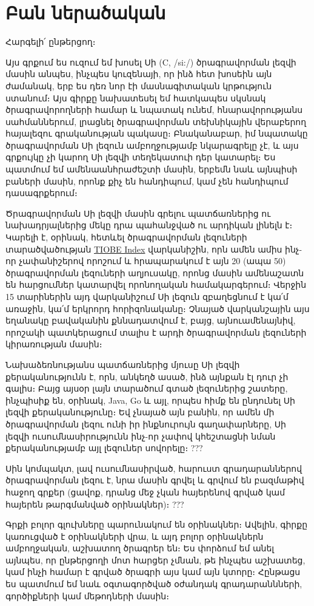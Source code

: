 \chapter*{Բան ներածական}

Հարգելի՛ ընթերցող։

Այս գրքում ես ուզում եմ խոսել Սի (C, /si:/) ծրագրավորման լեզվի մասին անպես, ինչպես կուզենայի, որ ինձ հետ խոսեին այն ժամանակ, երբ ես դեռ նոր էի մասնագիտական կրթություն ստանում։ Այս գիրքը նախատեսել եմ հատկապես սկսնակ ծրագրավորողների համար և նպատակ ունեմ, հնարավորությանս սահմաններում, լրացնել ծրագրավորման տեխնիկային վերաբերող հայալեզու գրականության պակասը։ Բնականաբար, իմ նպատակը ծրագրավորման Սի լեզուն ամբողջությամբ նկարագրելը չէ, և այս գրքույկը չի կարող Սի լեզվի տեղեկատուի դեր կատարել։ Ես պատմում եմ ամենաանհրաժեշտի մասին, երբեմն նաև այնպիսի բաների մասին, որոնք քիչ են հանդիպում, կամ չեն հանդիպում դասագրքերում։

Ծրագրավորման Սի լեզվի մասին գրելու պատճառներից ու նախադրյալներից մեկը դրա պահանջված ու արդիկան լինելն է։ Կարելի է, օրինակ, հետևել ծրագրավորման լեզուների տարածվածության \href{http://www.tiobe.com/index.php/content/paperinfo/tpci/index.html}{TIOBE Index} վարկանիշին, որն ամեն ամիս ինչ-որ չափանիշերով որոշում և հրապարակում է այն 20 (ապա 50) ծրագրավորման լեզուների աղյուսակը, որոնց մասին ամենաշատն են հարցումներ կատարվել որոնողական համակարգերում։ Վերջին 15 տարիներին այդ վարկանիշում Սի լեզուն զբաղեցնում է կա՛մ առաջին, կա՛մ երկրորդ հորիզոնականը։ Չնայած վարկանշային այս եղանակը բավականին քննադատվում է, բայց, այնուամենայնիվ, որոշակի պատկերացում տալիս է արդի ծրագրավորման լեզուների կիրառության մասին։

Նախաձեռնությանս պատճառներից մյուսը Սի լեզվի քերականությունն է, որն, անկեղծ ասած, ինձ այնքան էլ դուր չի գալիս։ Բայց այսօր լայն տարածում գտած լեզուներից շատերը, ինչպիսիք են, օրինակ, Java, Go և այլ, որպես հիմք են ընդունել Սի լեզվի քերականությունը։ Եվ չնայած այն բանին, որ ամեն մի ծրագրավորման լեզու ունի իր ինքնուրույն գաղափարները, Սի լեզվի ուսումնասիրությունն ինչ-որ չափով կհեշտացնի նման քերականությամբ այլ լեզուներ սովորելը։ ???

Սին կոմպակտ, լավ ուսումնասիրված, հարուստ գրադարաններով ծրագրավորման լեզու է, նրա մասին գրվել և գրվում են բազմաթիվ հաջող գրքեր (ցավոք, դրանց մեջ չկան հայերենով գրված կամ հայերեն թարգմանված օրինակներ)։ ???

Գրքի բոլոր գլուխները պարունակում են օրինակներ։ Ավելին, գիրքը կառուցված է օրինակների վրա, և այդ բոլոր օրինակներն ամբողջական, աշխատող ծրագրեր են։ Ես փորձում եմ անել այնպես, որ ընթերցողի մոտ հարցեր չմնան, թե ինչպես աշխատեց, կամ ինչի համար է գրված ծրագրի այս կամ այն կտորը։ Հընթացս ես պատմում եմ նաև օգտագործված օժանդակ գրադարաննների, գործիքների կամ մեթոդների մասին։
